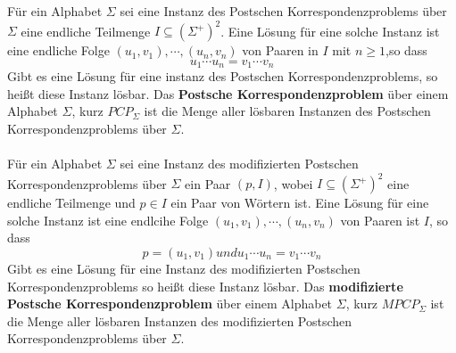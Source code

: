 \begin{center}
  
        
  \end{center}

   Für ein Alphabet $\Sigma$ sei eine Instanz des Postschen Korrespondenzproblems über $\Sigma$ eine endliche Teilmenge $I \subseteq (\Sigma^+)^2$. Eine Lösung für eine solche Instanz ist eine endliche Folge $(u_1, v_1), \cdots, (u_n, v_n)$ von Paaren in $I$ mit $n \geq 1$,so dass \[u_1 \cdots u_n = v_1 \cdots v_n\] Gibt es eine Lösung für eine instanz des Postschen Korrespondenzproblems, so heißt diese Instanz lösbar. Das \textbf{Postsche Korrespondenzproblem} über einem Alphabet $\Sigma$, kurz $PCP_{\Sigma}$ ist die Menge aller lösbaren Instanzen des Postschen Korrespondenzproblems über $\Sigma$.\\\\ Für ein Alphabet $\Sigma$ sei eine Instanz des modifizierten Postschen Korrespondenzproblems über $\Sigma$ ein Paar $(p, I)$, wobei $I\subseteq (\Sigma^+)^2$ eine endliche Teilmenge und $p\in I$ ein Paar von Wörtern ist. Eine Lösung für eine solche Instanz ist eine endlcihe Folge $(u_1, v_1), \cdots, (u_n, v_n)$ von Paaren ist $I$, so dass \[p = (u_1, v_1) und u_1\cdots u_n = v_1\cdots v_n\] Gibt es eine Lösung für eine Instanz des modifizierten Postschen Korrespondenzproblems so heißt diese Instanz lösbar. Das \textbf{modifizierte Postsche Korrespondenzproblem} über einem Alphabet $\Sigma$, kurz $MPCP_{\Sigma}$ ist die Menge aller lösbaren Instanzen des modifizierten Postschen Korrespondenzproblems über $\Sigma$.
